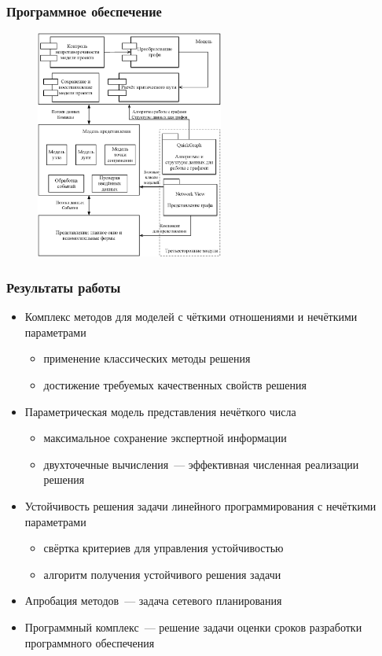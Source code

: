 \documentclass[12pt]{beamer}
\begin{document}

\begin{frame}
  \frametitle{Программное обеспечение}
  \begin{figure}
    \center
    \includegraphics[width=0.55\textwidth]{app-architecture}
  \end{figure}
\end{frame}


\begin{frame}
  \frametitle{Результаты работы}
  \begin{itemize}
    \item Комплекс методов для моделей с чёткими отношениями и нечёткими параметрами
    \begin{itemize}
      \item применение классических методы решения
      \item достижение требуемых качественных свойств решения
    \end{itemize}
    \item Параметрическая модель представления нечёткого числа
    \begin{itemize}
      \item максимальное сохранение экспертной информации
      \item двухточечные вычисления~--- эффективная численная реализации решения
    \end{itemize}
    \item Устойчивость решения задачи линейного программирования с нечёткими параметрами
    \begin{itemize}
      \item свёртка критериев для управления устойчивостью
      \item алгоритм получения устойчивого решения задачи
    \end{itemize}
    \item Апробация методов~--- задача сетевого планирования
    \item Программный комплекс~--- решение задачи оценки сроков разработки программного обеспечения
  \end{itemize}
\end{frame}
\end{document}
